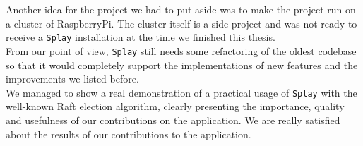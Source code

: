 \documentclass{eplmastersthesis}
\begin{document}
      Another idea for the project we had to put aside was to make the project
      run on a cluster of RaspberryPi. The cluster itself is a side-project
      and was not ready to receive a \texttt{Splay} installation at the
      time we finished this thesis.\\
      From our point of view, \texttt{Splay} still needs some refactoring
      of the oldest codebase so that it would completely support the
      implementations of new features and the improvements we listed before.\\

      We managed to show a real demonstration of a practical usage of
      \texttt{Splay} with the well-known Raft election algorithm, clearly
      presenting the importance, quality and usefulness of our contributions
      on the application. We are really satisfied about the results of our
      contributions to the application.

  \nocite{*}
  
  

  \backcoverpage
\end{document}
